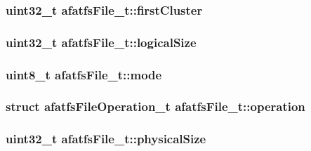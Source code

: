 \hypertarget{structafatfsFile__t_ae30b166fa89b854403f413d9177106d3}{
\subsubsection[{first\+Cluster}]{\setlength{\rightskip}{0pt plus 5cm}uint32\+\_\+t afatfs\+File\+\_\+t\+::first\+Cluster}}\label{structafatfsFile__t_ae30b166fa89b854403f413d9177106d3}
\hypertarget{structafatfsFile__t_ae2c2820c2fa2a6ffee93277012cb8154}{
\subsubsection[{logical\+Size}]{\setlength{\rightskip}{0pt plus 5cm}uint32\+\_\+t afatfs\+File\+\_\+t\+::logical\+Size}}\label{structafatfsFile__t_ae2c2820c2fa2a6ffee93277012cb8154}
\hypertarget{structafatfsFile__t_adb8bf0b607d96cd7e5931331b386bfcd}{
\subsubsection[{mode}]{\setlength{\rightskip}{0pt plus 5cm}uint8\+\_\+t afatfs\+File\+\_\+t\+::mode}}\label{structafatfsFile__t_adb8bf0b607d96cd7e5931331b386bfcd}
\hypertarget{structafatfsFile__t_a44aa2ed047680abcdf64a577bb82f172}{
\subsubsection[{operation}]{\setlength{\rightskip}{0pt plus 5cm}struct {\bf afatfs\+File\+Operation\+\_\+t} afatfs\+File\+\_\+t\+::operation}}\label{structafatfsFile__t_a44aa2ed047680abcdf64a577bb82f172}
\hypertarget{structafatfsFile__t_ab53943432ab06960d593296dbb50c582}{
\subsubsection[{physical\+Size}]{\setlength{\rightskip}{0pt plus 5cm}uint32\+\_\+t afatfs\+File\+\_\+t\+::physical\+Size}}\label{structafatfsFile__t_ab53943432ab06960d593296dbb50c582}
